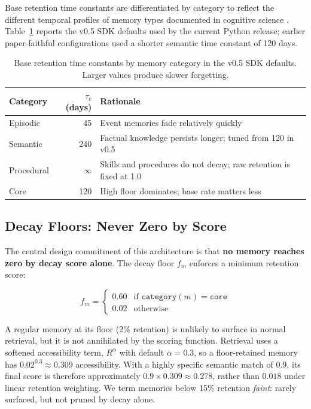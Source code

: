 \documentclass[11pt,a4paper]{article}
\begin{document}
Base retention time constants are differentiated by category to reflect the different temporal profiles of memory types documented in cognitive science \citep{finley2025expanded}. Table~\ref{tab:decay} reports the v0.5 SDK defaults used by the current Python release; earlier paper-faithful configurations used a shorter semantic time constant of 120 days.

\begin{table}[htbp]
\centering
\small
\begin{tabular}{@{}lrl@{}}
\toprule
\textbf{Category} & \textbf{$\tau_c$ (days)} & \textbf{Rationale} \\
\midrule
Episodic & 45 & Event memories fade relatively quickly \\
Semantic & 240 & Factual knowledge persists longer; tuned from 120 in v0.5 \\
Procedural & $\infty$ & Skills and procedures do not decay; raw retention is fixed at 1.0 \\
Core & 120 & High floor dominates; base rate matters less \\
\bottomrule
\end{tabular}
\caption{Base retention time constants by memory category in the v0.5 SDK defaults. Larger values produce slower forgetting.}
\label{tab:decay}
\end{table}

\subsection{Decay Floors: Never Zero by Score}
\label{sec:floors}

The central design commitment of this architecture is that \textbf{no memory reaches zero by decay score alone}. The decay floor $f_m$ enforces a minimum retention score:

\begin{equation}
f_m = \begin{cases}
0.60 & \text{if } \texttt{category}(m) = \texttt{core} \\
0.02 & \text{otherwise}
\end{cases}
\end{equation}

A regular memory at its floor (2\% retention) is unlikely to surface in normal retrieval, but it is not annihilated by the scoring function. Retrieval uses a softened accessibility term, $R^\alpha$ with default $\alpha=0.3$, so a floor-retained memory has $0.02^{0.3} \approx 0.309$ accessibility. With a highly specific semantic match of 0.9, its final score is therefore approximately $0.9 \times 0.309 \approx 0.278$, rather than $0.018$ under linear retention weighting. We term memories below 15\% retention \emph{faint}: rarely surfaced, but not pruned by decay alone.
\end{document}
